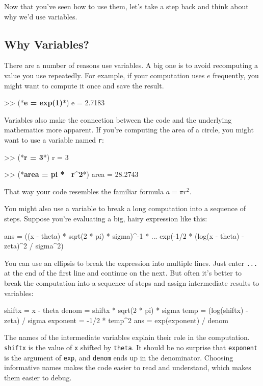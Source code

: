 Now that you've seen how to use them, let's take a step back and think about why we'd use variables.

\subsection{Why Variables?}

There are a number of reasons use variables. 
A big one is to avoid recomputing a value you use repeatedly.  For
example, if your computation uses $e$ frequently, you might
want to compute it once and save the result.

\begin{code}
>> (*\textbf{e = exp(1)}*)
e = 2.7183
\end{code}

Variables also make the connection between the code and the underlying
mathematics more apparent.  If you're computing the area of a circle,
you might want to use a variable named \lstinline{r}:

\begin{code}
>> (*\textbf{r = 3}*)
r = 3

>> (*\textbf{area = pi * ~r\^{}2}*)
area = 28.2743
\end{code}

That way your code resembles the familiar formula $a = \pi r^2$.

You might also use a variable to break a long computation into a sequence of steps.
Suppose you're evaluating a big, hairy expression like this:

\begin{code}
ans = ((x - theta) * sqrt(2 * pi) * sigma)^-1 * ...
exp(-1/2 * (log(x - theta) - zeta)^2 / sigma^2)
\end{code}

You can use an ellipsis to break the expression into multiple lines.
Just enter \lstinline{...} at the end of the first line and continue on the
next.
But often it's better to break the computation into a sequence of
steps and assign intermediate results to variables:

\begin{code}
shiftx = x - theta
denom = shiftx * sqrt(2 * pi) * sigma
temp = (log(shiftx) - zeta) / sigma
exponent = -1/2 * temp^2
ans = exp(exponent) / denom
\end{code}

The names of the intermediate variables explain their role in the
computation.  \lstinline{shiftx} is the value of \lstinline{x} shifted by 
\lstinline{theta}.  It should be no surprise that \lstinline{exponent} is the argument of \lstinline{exp}, and \lstinline{denom} ends up in the denominator.  Choosing informative names makes the code easier to read and understand, which makes them easier to debug.

